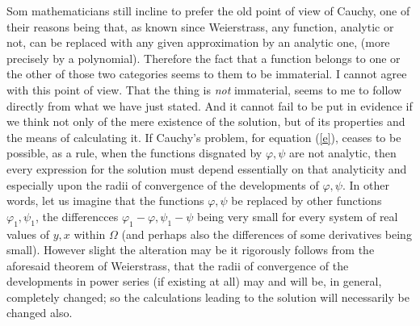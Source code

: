 \documentclass[12pt,oneside]{book}
\newcommand{\iit}[1]{\textit{#1}}
\begin{document}
Som mathematicians still incline to prefer the old point of view of Cauchy, one of their reasons being that, as known since Weierstrass, any function, analytic or not, can be replaced with any given approximation by an analytic one, (more precisely by a polynomial). Therefore the fact that a function belongs to one or the other of those two categories seems to them to be immaterial. I cannot agree with this point of view. That the thing is \iit{not} immaterial, seems to me to follow directly from what we have just stated. And it cannot fail to be put in evidence if we think not only of the mere existence of the solution, but of its properties and the means of calculating it. If Cauchy's problem, for equation (\ref{e}), ceases to be possible, as a rule, when the functions disgnated by $\varphi,\psi$ are not analytic, then every expression for the solution must depend essentially on that analyticity and especially upon the radii of convergence of the developments of $\varphi,\psi$. In other words, let us imagine that the functions $\varphi,\psi$ be replaced by other functions $\varphi_1,\psi_1$, the differencces $\varphi_1-\varphi,\psi_1-\psi$ being very small for every system of real values of $y,x$ within $\Omega$ (and perhaps also the differences of some derivatives being small). However slight the alteration may be it rigorously follows from the aforesaid theorem of Weierstrass, that the radii of convergence of the developments in power series (if existing at all) may and will be, in general, completely changed; so the calculations leading to the solution will necessarily be changed also. \par
\end{document}
